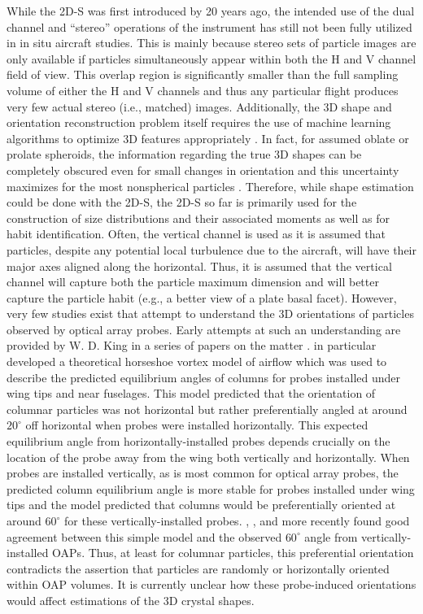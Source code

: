 \documentclass[amt, manuscript]{copernicus}
\begin{document}
While the 2D-S was first introduced by \citet{Lawson2006} 20 years ago, the intended use of the dual channel and ``stereo'' operations of the instrument has still not been fully utilized in in situ aircraft studies. This is mainly because stereo sets of particle images are only available if particles simultaneously appear within both the H and V channel field of view. This overlap region is significantly smaller than the full sampling volume of either the H and V channels and thus any particular flight produces very few actual stereo (i.e., matched) images. Additionally, the 3D shape and orientation reconstruction problem itself requires the use of machine learning algorithms to optimize 3D features appropriately \citep[e.g.,][]{Jiang2019,Leinonen2021}. In fact, for assumed oblate or prolate spheroids, the information regarding the true 3D shapes can be completely obscured even for small changes in orientation and this uncertainty maximizes for the most nonspherical particles \citep{Dunnavan2019a}. Therefore, while shape estimation could be done with the 2D-S, the 2D-S so far is primarily used for the construction of size distributions and their associated moments as well as for habit identification. Often, the vertical channel is used as it is assumed that particles, despite any potential local turbulence due to the aircraft, will have their major axes aligned along the horizontal. Thus, it is assumed that the vertical channel will capture both the particle maximum dimension and will better capture the particle habit (e.g., a better view of a plate basal facet). However, very few studies exist that attempt to understand the 3D orientations of particles observed by optical array probes. Early attempts at such an understanding are provided by W. D. King in a series of papers on the matter \citep{King1985a,King1985b,King1985c,King1985d}. \citet{King1985d} in particular developed a theoretical horseshoe vortex model of airflow which was used to describe the predicted equilibrium angles of columns for probes installed under wing tips and near fuselages. This model predicted that the orientation of columnar particles was not horizontal but rather preferentially angled at around $20^{\circ}$ off horizontal when probes were installed horizontally. This expected equilibrium angle from horizontally-installed probes depends crucially on the location of the probe away from the wing both vertically and horizontally. When probes are installed vertically, as is most common for optical array probes, the predicted column equilibrium angle is more stable for probes installed under wing tips and the \citet{King1985d} model predicted that columns would be preferentially oriented at around $60^{\circ}$ for these vertically-installed probes. \citet{King1985d}, \citet{MacPherson1988}, and more recently \citet{Obrien2016} found good agreement between this simple model and the observed $60^{\circ}$ angle from vertically-installed OAPs. Thus, at least for columnar particles, this preferential orientation contradicts the assertion that particles are randomly or horizontally oriented within OAP volumes. It is currently unclear how these probe-induced orientations would affect estimations of the 3D crystal shapes.
\end{document}
